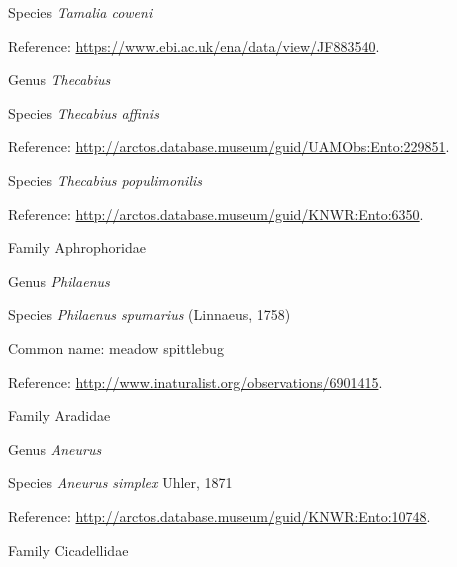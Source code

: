 \documentclass[9pt, article]{memoir}
\begin{document}
\begin{multicols}{2}
\vspace{6pt}\noindent\hspace{36pt}Species \textit{Tamalia coweni}


Reference: 
\url{https://www.ebi.ac.uk/ena/data/view/JF883540}.

\vspace{6pt}\noindent\hspace{30pt}Genus \textit{Thecabius}


\vspace{6pt}\noindent\hspace{36pt}Species \textit{Thecabius affinis}


Reference: 
\url{http://arctos.database.museum/guid/UAMObs:Ento:229851}.

\vspace{6pt}\noindent\hspace{36pt}Species \textit{Thecabius populimonilis}


Reference: 
\url{http://arctos.database.museum/guid/KNWR:Ento:6350}.

\vspace{6pt}\noindent\hspace{24pt}Family Aphrophoridae


\vspace{6pt}\noindent\hspace{30pt}Genus \textit{Philaenus}


\vspace{6pt}\noindent\hspace{36pt}Species \textit{Philaenus spumarius} (Linnaeus, 1758)


Common name: meadow spittlebug

Reference: 
\url{http://www.inaturalist.org/observations/6901415}.

\vspace{6pt}\noindent\hspace{24pt}Family Aradidae


\vspace{6pt}\noindent\hspace{30pt}Genus \textit{Aneurus}


\vspace{6pt}\noindent\hspace{36pt}Species \textit{Aneurus simplex} Uhler, 1871


Reference: 
\url{http://arctos.database.museum/guid/KNWR:Ento:10748}.

\vspace{6pt}\noindent\hspace{24pt}Family Cicadellidae



\end{multicols}
\end{document}
